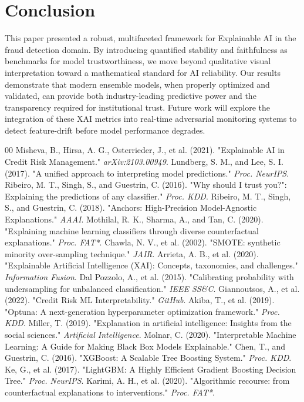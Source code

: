\documentclass[conference]{IEEEtran}
\begin{document}
\section{Conclusion}
This paper presented a robust, multifaceted framework for Explainable AI in the fraud detection domain. By introducing quantified stability and faithfulness as benchmarks for model trustworthiness, we move beyond qualitative visual interpretation toward a mathematical standard for AI reliability. Our results demonstrate that modern ensemble models, when properly optimized and validated, can provide both industry-leading predictive power and the transparency required for institutional trust. Future work will explore the integration of these XAI metrics into real-time adversarial monitoring systems to detect feature-drift before model performance degrades.

\begin{thebibliography}{00}
 Misheva, B., Hirsa, A. G., Osterrieder, J., et al. (2021). "Explainable AI in Credit Risk Management." \textit{arXiv:2103.00949}.
 Lundberg, S. M., and Lee, S. I. (2017). "A unified approach to interpreting model predictions." \textit{Proc. NeurIPS}.
 Ribeiro, M. T., Singh, S., and Guestrin, C. (2016). "Why should I trust you?": Explaining the predictions of any classifier." \textit{Proc. KDD}.
 Ribeiro, M. T., Singh, S., and Guestrin, C. (2018). "Anchors: High-Precision Model-Agnostic Explanations." \textit{AAAI}.
 Mothilal, R. K., Sharma, A., and Tan, C. (2020). "Explaining machine learning classifiers through diverse counterfactual explanations." \textit{Proc. FAT*}.
 Chawla, N. V., et al. (2002). "SMOTE: synthetic minority over-sampling technique." \textit{JAIR}.
 Arrieta, A. B., et al. (2020). "Explainable Artificial Intelligence (XAI): Concepts, taxonomies, and challenges." \textit{Information Fusion}.
 Dal Pozzolo, A., et al. (2015). "Calibrating probability with undersampling for unbalanced classification." \textit{IEEE SS\&C}.
 Giannoutsos, A., et al. (2022). "Credit Risk ML Interpretability." \textit{GitHub}.
 Akiba, T., et al. (2019). "Optuna: A next-generation hyperparameter optimization framework." \textit{Proc. KDD}.
 Miller, T. (2019). "Explanation in artificial intelligence: Insights from the social sciences." \textit{Artificial Intelligence}.
 Molnar, C. (2020). "Interpretable Machine Learning: A Guide for Making Black Box Models Explainable."
 Chen, T., and Guestrin, C. (2016). "XGBoost: A Scalable Tree Boosting System." \textit{Proc. KDD}.
 Ke, G., et al. (2017). "LightGBM: A Highly Efficient Gradient Boosting Decision Tree." \textit{Proc. NeurIPS}.
 Karimi, A. H., et al. (2020). "Algorithmic recourse: from counterfactual explanations to interventions." \textit{Proc. FAT*}.
\end{thebibliography}
\end{document}
